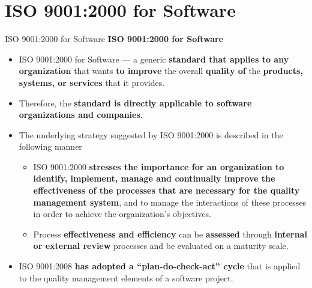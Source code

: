 \documentclass{beamer}
\begin{document}
\section{ISO 9001:2000 for Software}
\begin{frame}{ISO 9001:2000 for Software}
\textbf{ISO 9001:2000 for Software}
\begin{itemize}
	\item ISO 9001:2000 for Software — a generic\textbf{ standard that applies to any organization} that wants \textbf{to improve} the overall \textbf{quality of} the \textbf{products, systems, or services} that it provides.
	\item Therefore, the \textbf{standard is directly applicable to software organizations and companies}. 
	\item The underlying strategy suggested by ISO 9001:2000 is described in the following manner
	\begin{itemize}
		\item  ISO 9001:2000 \textbf{stresses the importance for an organization to identify, implement, manage and continually improve the effectiveness of the processes that are necessary for the quality management system}, and to manage the interactions of these processes in order to achieve the organization’s objectives.
		\item Process\textbf{ effectiveness and efficiency} can be \textbf{assessed} through \textbf{internal or external review} processes and be evaluated on a maturity scale. 
	\end{itemize}
	
	\item ISO 9001:2008 \textbf{has adopted a “plan-do-check-act” cycle }that is applied to the quality management elements of a software project. 
	
\end{itemize}
	
\end{frame}
\end{document}
